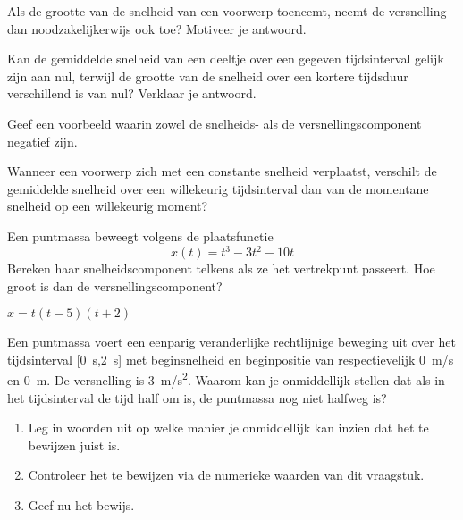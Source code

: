 \documentclass{ximera}
\begin{document}
	\author{Bart Lambregs}
    \xmsource\xmuitleg

\begin{exercise}
	Als de grootte van de snelheid van een voorwerp toeneemt, neemt de versnelling dan noodzakelijkerwijs ook toe? Motiveer je antwoord.
\end{exercise}

\begin{exercise}
	Kan de gemiddelde snelheid van een deeltje over een gegeven tijdsinterval gelijk zijn aan nul, terwijl de grootte van de snelheid over een kortere tijdsduur verschillend is van nul? Verklaar je antwoord.
\end{exercise}

\begin{exercise}
	Geef een voorbeeld waarin zowel de snelheids- als de versnellingscomponent negatief zijn.
\end{exercise}

\begin{exercise}
	Wanneer een voorwerp zich met een constante snelheid verplaatst, verschilt de gemiddelde snelheid over een willekeurig tijdsinterval dan van de momentane snelheid op een willekeurig moment?
\end{exercise}

\begin{exercise}
	Een puntmassa beweegt volgens de plaatsfunctie
	\[
	x(t)=t^3-3t^2-10t
	\]
	Bereken haar snelheidscomponent telkens als ze het vertrekpunt passeert. Hoe groot is dan de versnellingscomponent?
	\begin{oplossing}
		$x=t(t-5)(t+2)$
	\end{oplossing}
\end{exercise}

\begin{exercise}
    Een puntmassa voert een eenparig veranderlijke rechtlijnige beweging uit over het tijdsinterval [\SI{0}{s},\SI{2}{s}] met beginsnelheid en beginpositie van respectievelijk \SI{0}{m/s} en \SI{0}{m}. De versnelling is \SI{3}{m/s^2}. Waarom kan je onmiddellijk stellen dat als in het tijdsinterval de tijd half om is, de puntmassa nog niet halfweg is?
    \begin{enumerate}
        \item Leg in woorden uit op welke manier je onmiddellijk kan inzien dat het te bewijzen juist is.
        \item Controleer het te bewijzen via de numerieke waarden van dit vraagstuk.
        \item Geef nu het bewijs.
    \end{enumerate}
\end{exercise}
\end{document}
